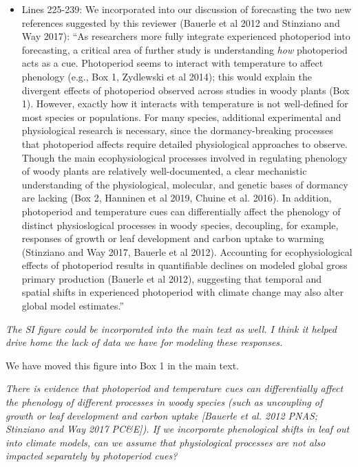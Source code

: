 \documentclass{article}
\begin{document}
\begin{itemize}
\item Lines 225-239: We incorporated into our discussion of forecasting the two new references suggested by this reviewer (Bauerle et al 2012 and Stinziano and Way 2017): ``As researchers more fully integrate experienced photoperiod into forecasting, a critical area of further study is understanding \emph{how} photoperiod acts as a cue. Photoperiod seems to interact with temperature to affect phenology (e.g., Box 1, Zydlewski et al 2014); this would explain the divergent effects of photoperiod observed across studies in woody plants (Box 1). However, exactly how it interacts with temperature is not well-defined for most species or populations. For many species, additional experimental and physiological research is necessary, since the dormancy-breaking processes that photoperiod affects require detailed physiological approaches to observe. Though the main ecophysiological processes involved in regulating phenology of woody plants are relatively well-documented, a clear mechanistic understanding of the physiological, molecular, and genetic bases of dormancy are lacking (Box 2, Hanninen et al 2019, Chuine et al. 2016). In addition, photoperiod and temperature cues can differentially affect the phenology of distinct physioslogical processes in woody species, decoupling, for example, responses of growth or leaf development and carbon uptake to warming (Stinziano and Way 2017, Bauerle et al 2012). Accounting for ecophysiological effects of photoperiod results in quantifiable declines on modeled global gross primary production (Bauerle et al 2012), suggesting that temporal and spatial shifts in experienced photoperiod with climate change may also alter global model estimates.''


\end{itemize}
\par \emph{The SI figure could be incorporated into the main text as well. I think it helped drive home the lack of data we have for modeling these responses.}

\par We have moved this figure into Box 1 in the main text.

\par \emph{There is evidence that photoperiod and temperature cues can differentially affect the phenology of different processes in woody species (such as uncoupling of growth or leaf development and carbon uptake [Bauerle et al. 2012 PNAS; Stinziano and Way 2017 PC\&E]). If we incorporate phenological shifts in leaf out into climate models, can we assume that physiological processes are not also impacted separately by photoperiod cues?} 
\end{document}
